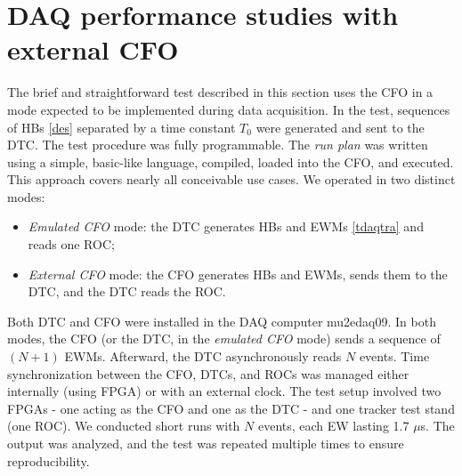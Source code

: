 \section{DAQ performance studies with external CFO}
The brief and straightforward test described in this section uses the CFO in a mode expected to be 
implemented during data acquisition. 
In the test, sequences of HBs \ref{des} separated by a time constant  
\( T_0 \) were generated and sent to the DTC. The test procedure was fully programmable. 
The \textit{run plan} was written using a simple, basic-like language, 
compiled, loaded into the CFO, and executed. This approach covers nearly all conceivable use cases. We operated in two distinct modes:
\begin{itemize}
  \item \textit{Emulated CFO} mode: the DTC generates HBs and EWMs \ref{tdaqtra} and reads one ROC;
  \item \textit{External CFO} mode: the CFO generates HBs and EWMs, sends them to the DTC, and the DTC reads the ROC.
\end{itemize}
Both DTC and CFO were installed in the DAQ computer mu2edaq09.
In both modes, the CFO (or the DTC, in the \textit{emulated CFO} mode) 
sends a sequence of \( (N+1) \) EWMs. Afterward, the DTC 
asynchronously reads \( N \) events. 
Time synchronization between the CFO, DTCs, and ROCs was managed either 
internally (using FPGA) or with an external clock. 
The test setup involved two FPGAs - one acting as the CFO and one as the DTC - and one tracker test stand (one ROC). 
We conducted short runs with \( N \) events, each EW lasting  1.7 $\mu$s. 
The output was analyzed, and the test was repeated multiple times to ensure reproducibility. 


